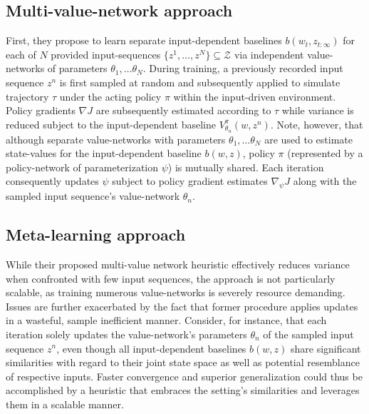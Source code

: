 \subsection{Multi-value-network approach}
First, they propose to learn separate input-dependent baselines $b(w_t,z_{t:\infty})$ for each of $N$ provided input-sequences $\{z^1, \dots, z^N\} \subseteq \mathcal{Z}$ via independent value-networks of parameters $\theta_1, \dots \theta_N$. During training, a previously recorded input sequence $z^n$ is first sampled at random and subsequently applied to simulate trajectory $\tau$ under the acting policy $\pi$ within the input-driven environment. Policy gradients $\nabla J$ are subsequently estimated according to $\tau$ while variance is reduced subject to the input-dependent baseline $V^{\pi}_{\theta_n}(w,z^n)$. Note, however, that although separate value-networks with parameters $\theta_1, \dots \theta_N$ are used to estimate state-values for the input-dependent baseline $b(w,z)$, policy $\pi$ (represented by a policy-network of parameterization $\psi$) is mutually shared. Each iteration consequently updates $\psi$ subject to policy gradient estimates $\nabla_{\psi} J$ along with the sampled input sequence's value-network $\theta_n$.

\subsection{Meta-learning approach}

While their proposed multi-value network heuristic effectively reduces variance when confronted with few input sequences, the approach is not particularly scalable, as training numerous value-networks is severely resource demanding. Issues are further exacerbated by the fact that former procedure applies updates in a wasteful, sample inefficient manner. Consider, for instance, that each iteration solely updates the value-network's parameters $\theta_n$ of the sampled input sequence $z^n$, even though all input-dependent baselines $b(w,z)$ share significant similarities with regard to their joint state space as well as potential resemblance of respective inputs. Faster convergence and superior generalization could thus be accomplished by a heuristic that embraces the setting's similarities and leverages them in a scalable manner.


